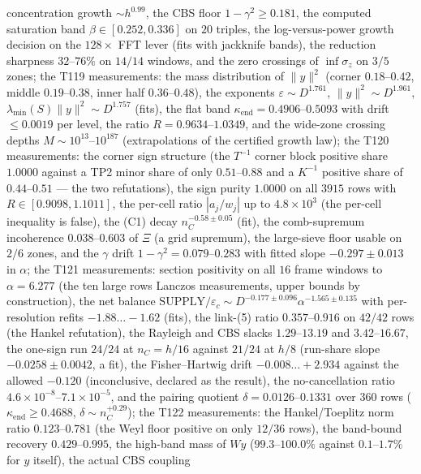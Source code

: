 \documentclass[11pt,a4paper]{article}
\begin{document}
\begin{keybox}
concentration growth $\sim h^{0.99}$, the CBS floor $1-\gamma^2\ge0.181$, the computed
saturation band $\beta\in[0.252,0.336]$ on $20$ triples, the log-versus-power growth decision
on the $128\times$ FFT lever (fits with jackknife bands), the reduction sharpness
$32$--$76\%$ on $14/14$ windows, and the zero crossings of $\inf\sigma_z$ on $3/5$ zones; the
T119 measurements: the mass distribution of $\|y\|^2$ (corner $0.18$--$0.42$, middle
$0.19$--$0.38$, inner half $0.36$--$0.48$), the exponents $\varepsilon\sim D^{1.761}$,
$\|y\|^2\sim D^{1.961}$, $\lambda_{\min}(S)\|y\|^2\sim D^{1.757}$ (fits), the flat band
$\kappa_{\mathrm{end}}=0.4906$--$0.5093$ with drift $\le0.0019$ per level, the ratio
$R=0.9634$--$1.0349$, and the wide-zone crossing depths $M\sim10^{13}$--$10^{187}$
(extrapolations of the certified growth law); the T120 measurements: the corner sign
structure (the $T^{-1}$ corner block positive share $1.0000$ against a TP2 minor share of
only $0.51$--$0.88$ and a $K^{-1}$ positive share of $0.44$--$0.51$ --- the two refutations),
the sign purity $1.0000$ on all $3915$ rows with $R\in[0.9098,1.1011]$, the per-cell ratio
$|a_j/w_j|$ up to $4.8\times10^{3}$ (the per-cell inequality is false), the (C1) decay
$n_C^{-0.58\pm0.05}$ (fit), the comb-supremum incoherence $0.038$--$0.603$ of $\Xi$ (a grid
supremum), the large-sieve floor usable on $2/6$ zones, and the $\gamma$ drift
$1-\gamma^2=0.079$--$0.283$ with fitted slope $-0.297\pm0.013$ in $\alpha$; the T121
measurements: section positivity on all $16$ frame windows to $\alpha=6.277$ (the ten large
rows Lanczos measurements, upper bounds by construction), the net balance
$\mathrm{SUPPLY}/\varepsilon_c\sim D^{-0.177\pm0.096}\alpha^{-1.565\pm0.135}$ with
per-resolution refits $-1.88\ldots-1.62$ (fits), the link-(5) ratio $0.357$--$0.916$ on
$42/42$ rows (the Hankel refutation), the Rayleigh and CBS slacks $1.29$--$13.19$ and
$3.42$--$16.67$, the one-sign run $24/24$ at $n_C=h/16$ against $21/24$ at $h/8$ (run-share
slope $-0.0258\pm0.0042$, a fit), the Fisher--Hartwig drift $-0.008\ldots+2.934$ against the
allowed $-0.120$ (inconclusive, declared as the result), the no-cancellation ratio
$4.6\times10^{-8}$--$7.1\times10^{-5}$, and the pairing quotient $\delta=0.0126$--$0.1331$
over $360$ rows ($\kappa_{\mathrm{end}}\ge0.4688$, $\delta\sim n_C^{+0.29}$); the T122
measurements: the Hankel/Toeplitz norm ratio $0.123$--$0.781$ (the Weyl floor positive on only
$12/36$ rows), the band-bound recovery $0.429$--$0.995$, the high-band mass of $Wy$
($99.3$--$100.0\%$ against $0.1$--$1.7\%$ for $y$ itself), the actual CBS coupling

\end{keybox}
\end{document}
